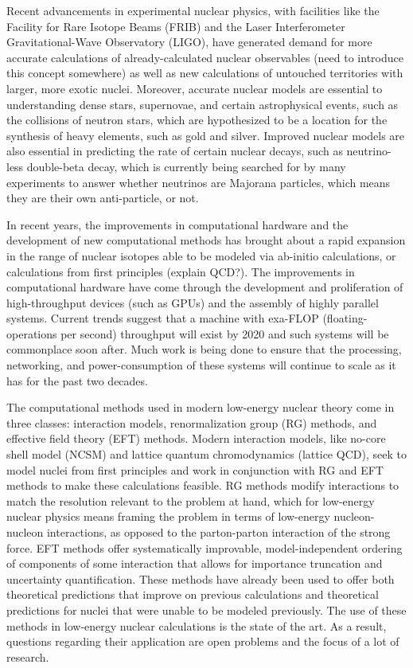 Recent advancements in experimental nuclear physics, with facilities like the Facility for Rare Isotope Beams (FRIB) and the Laser Interferometer Gravitational-Wave Observatory (LIGO), have generated demand for more accurate calculations of already-calculated nuclear observables (need to introduce this concept somewhere) as well as new calculations of untouched territories with larger, more exotic nuclei. Moreover, accurate nuclear models are essential to understanding dense stars, supernovae, and certain astrophysical events, such as the collisions of neutron stars, which are hypothesized to be a location for the synthesis of heavy elements, such as gold and silver. Improved nuclear models are also essential in predicting the rate of certain nuclear decays, such as neutrino-less double-beta decay, which is currently being searched for by many experiments to answer whether neutrinos are Majorana particles, which means they are their own anti-particle, or not.

In recent years, the improvements in computational hardware and the development of new computational methods has brought about a rapid expansion in the range of nuclear isotopes able to be modeled via ab-initio calculations, or calculations from first principles (explain QCD?). The improvements in computational hardware have come through the development and proliferation of high-throughput devices (such as GPUs) and the assembly of highly parallel systems. Current trends suggest that a machine with exa-FLOP (floating-operations per second) throughput will exist by 2020 and such systems will be commonplace soon after. Much work is being done to ensure that the processing, networking, and power-consumption of these systems will continue to scale as it has for the past two decades. 

The computational methods used in modern low-energy nuclear theory come in three classes: interaction models, renormalization group (RG) methods, and effective field theory (EFT) methods. Modern interaction models, like no-core shell model (NCSM) and lattice quantum chromodynamics (lattice QCD), seek to model nuclei from first principles and work in conjunction with RG and EFT methods to make these calculations feasible. RG methods modify interactions to match the resolution relevant to the problem at hand, which for low-energy nuclear physics means framing the problem in terms of low-energy nucleon-nucleon interactions, as opposed to the parton-parton interaction of the strong force. EFT methods offer systematically improvable, model-independent ordering of components of some interaction that allows for importance truncation and uncertainty quantification. These methods have already been used to offer both theoretical predictions that improve on previous calculations and theoretical predictions for nuclei that were unable to be modeled previously. The use of these methods in low-energy nuclear calculations is the state of the art. As a result, questions regarding their application are open problems and the focus of a lot of research.


